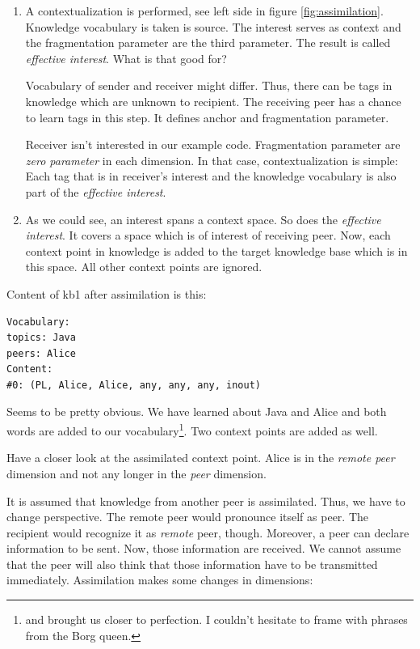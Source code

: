 \begin{enumerate}
\item
A contextualization is performed, see left side in figure \ref{fig:assimilation}. Knowledge vocabulary is taken is source. The interest serves as context and the fragmentation parameter are the third parameter. The result is called {\it effective interest}. What is that good for?

Vocabulary of sender and receiver might differ. Thus, there can be tags in knowledge which are unknown to recipient. The receiving peer has a chance to learn tags in this step. It defines anchor and fragmentation parameter.

Receiver isn't interested in our example code. Fragmentation parameter are {\it zero parameter} in each dimension. In that case, contextualization is simple: Each tag that is in receiver's interest and the knowledge vocabulary is also part of the {\it effective interest}.

\item
As we could see, an interest spans a context space. So does the {\it effective interest}. It covers a space which is of interest of receiving peer. Now, each context point in knowledge is added to the target knowledge base which is in this space. All other context points are ignored.
\end{enumerate}

Content of kb1 after assimilation is this:

\begin{verbatim}
Vocabulary:
topics: Java
peers: Alice
Content:
#0: (PL, Alice, Alice, any, any, any, inout)
\end{verbatim}

Seems to be pretty obvious. We have learned about Java and Alice and both words are added to our vocabulary\footnote{and brought us closer to perfection. I couldn't hesitate to frame with phrases from the Borg queen.}. Two context points are added as well.

Have a closer look at the assimilated context point. Alice is in the {\it remote peer} dimension and not any longer in the {\it peer} dimension.

It is assumed that knowledge from another peer is assimilated. Thus, we have to change perspective. The remote peer would pronounce itself as peer. The recipient would recognize it as {\it remote} peer, though. Moreover, a peer can declare information to be sent. Now, those information are received. We cannot assume that the peer will also think that those information have to be transmitted immediately. Assimilation makes some changes in dimensions:

